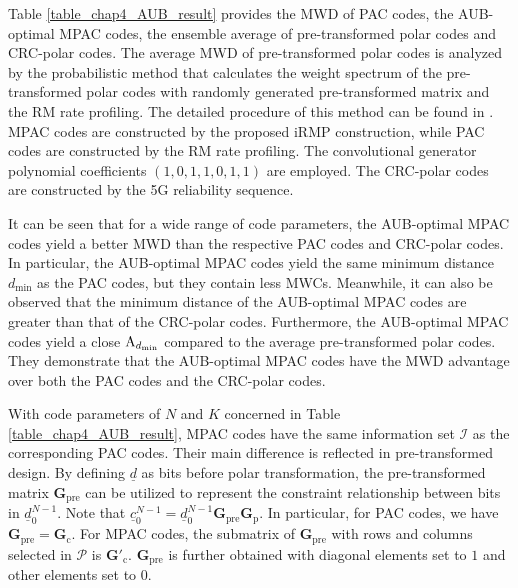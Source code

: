 \documentclass[12pt, draftclsnofoot, peerreview, onecolumn]{IEEEtran}
\theoremstyle{noparent}
\begin{document}
Table \ref{table_chap4_AUB_result} provides the MWD of PAC codes, the AUB-optimal MPAC codes, the ensemble average of pre-transformed polar codes \cite{Li2021WeightSpectrumPrea} and CRC-polar codes. The average MWD of pre-transformed polar codes is analyzed by the probabilistic method that calculates the weight spectrum of the pre-transformed polar codes with randomly generated pre-transformed matrix and the RM rate profiling.
The detailed procedure of this method can be found in \cite{Li2021WeightSpectrumPrea}.
MPAC codes are constructed by the proposed iRMP construction, while PAC codes are constructed by the RM rate profiling.
The convolutional generator polynomial coefficients $(1,0,1,1,0,1,1)$ are employed.
The CRC-polar codes are constructed by the 5G reliability sequence.





It can be seen that for a wide range of code parameters,
the AUB-optimal MPAC codes yield a better MWD than the respective PAC codes and CRC-polar codes.
In particular, the AUB-optimal MPAC codes yield the same minimum distance $d_{\min}$ as 
the PAC codes, but they contain less MWCs.
Meanwhile, it can also be observed that the minimum distance of the AUB-optimal MPAC codes are greater than
that of the CRC-polar codes. 
Furthermore, the AUB-optimal MPAC codes yield a close ${\rm A}_{d_{\min}}$ compared to the average pre-transformed polar codes.
They demonstrate that the AUB-optimal MPAC codes have the MWD advantage over both the PAC codes and the CRC-polar codes. 




With code parameters of $N$ and $K$ concerned in Table \ref{table_chap4_AUB_result}, MPAC codes have the same information set $\mathcal{I}$ as the corresponding PAC codes. Their main difference is reflected in pre-transformed design. By defining $\underline{d}$ as bits before polar transformation, the pre-transformed matrix $\mathbf{G}_{\mathrm{pre}}$ can be utilized to represent the constraint relationship between bits in $\underline{d}_{0}^{N-1}$. 
Note that $\underline{c}_{0}^{N-1}=\underline{d}_{0}^{N-1} \mathbf{G}_{\mathrm{pre}}\mathbf{G}_{\mathrm{p}}$. 
In particular, for PAC codes, we have
$\mathbf{G}_{\mathrm{pre}}=\mathbf{G}_{\mathrm{c}}$. 
For MPAC codes, the submatrix of $\mathbf{G}_{\mathrm{pre}}$ with rows and columns selected in $\mathcal{P}$ is $\mathbf{G}'_{\mathrm{c}}$. $\mathbf{G}_{\mathrm{pre}}$ is further obtained with diagonal elements set to $1$ and other elements set to $0$.
\end{document}
